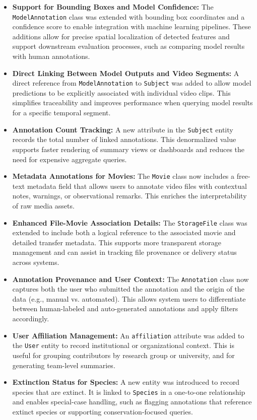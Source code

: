 \begin{itemize}
\item \textbf{Support for Bounding Boxes and Model Confidence:}
The \texttt{ModelAnnotation} class was extended with bounding box coordinates and a confidence score to enable integration with machine learning pipelines. These additions allow for precise spatial localization of detected features and support downstream evaluation processes, such as comparing model results with human annotations.

\item \textbf{Direct Linking Between Model Outputs and Video Segments:}
A direct reference from \texttt{ModelAnnotation} to \texttt{Subject} was added to allow model predictions to be explicitly associated with individual video clips. This simplifies traceability and improves performance when querying model results for a specific temporal segment.

\item \textbf{Annotation Count Tracking:}
A new attribute in the \texttt{Subject} entity records the total number of linked annotations. This denormalized value supports faster rendering of summary views or dashboards and reduces the need for expensive aggregate queries.

\item \textbf{Metadata Annotations for Movies:}
The \texttt{Movie} class now includes a free-text metadata field that allows users to annotate video files with contextual notes, warnings, or observational remarks. This enriches the interpretability of raw media assets.

\item \textbf{Enhanced File-Movie Association Details:}
The \texttt{StorageFile} class was extended to include both a logical reference to the associated movie and detailed transfer metadata. This supports more transparent storage management and can assist in tracking file provenance or delivery status across systems.

\item \textbf{Annotation Provenance and User Context:}
The \texttt{Annotation} class now captures both the user who submitted the annotation and the origin of the data (e.g., manual vs. automated). This allows system users to differentiate between human-labeled and auto-generated annotations and apply filters accordingly.

\item \textbf{User Affiliation Management:}
An \texttt{affiliation} attribute was added to the \texttt{User} entity to record institutional or organizational context. This is useful for grouping contributors by research group or university, and for generating team-level summaries.

\item \textbf{Extinction Status for Species:}
A new entity was introduced to record species that are extinct. It is linked to \texttt{Species} in a one-to-one relationship and enables special-case handling, such as flagging annotations that reference extinct species or supporting conservation-focused queries.
\end{itemize}

